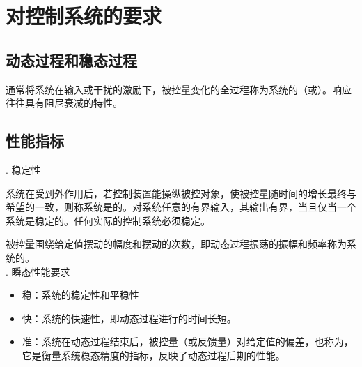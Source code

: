 \section{对控制系统的要求}
\subsection{动态过程和稳态过程}
{
\tdefination[动态过程]
通常将系统在输入或干扰的激励下，被控量变化的全过程称为系统的（或）。响应往往具有阻尼衰减的特性。
}\\

\subsection{性能指标}
. 稳定性

系统在受到外作用后，若控制装置能操纵被控对象，使被控量随时间的增长最终与希望的一致，则称系统是的。对系统任意的有界输入，其输出有界，当且仅当一个系统是稳定的。任何实际的控制系统必须稳定。

被控量围绕给定值摆动的幅度和摆动的次数，即动态过程振荡的振幅和频率称为系统的。\\

. 瞬态性能要求
\begin{itemize}
	\item 稳：系统的稳定性和平稳性
	\item 快：系统的快速性，即动态过程进行的时间长短。
	\item 准：系统在动态过程结束后，被控量（或反馈量）对给定值的偏差，也称为，它是衡量系统稳态精度的指标，反映了动态过程后期的性能。
\end{itemize}




